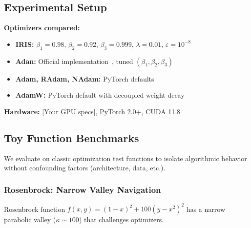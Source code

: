 \subsection{Experimental Setup}

\textbf{Optimizers compared:}
\begin{itemize}
    \item \textbf{IRIS:} $\beta_1=0.98$, $\beta_2=0.92$, $\beta_3=0.999$, $\lambda=0.01$, $\varepsilon=10^{-8}$
    \item \textbf{Adan:} Official implementation~\citep{xie2022adan}, tuned $(\beta_1, \beta_2, \beta_3)$
    \item \textbf{Adam, RAdam, NAdam:} PyTorch defaults
    \item \textbf{AdamW:} PyTorch default with decoupled weight decay
\end{itemize}

\textbf{Hardware:} [Your GPU specs], PyTorch 2.0+, CUDA 11.8

\subsection{Toy Function Benchmarks}

We evaluate on classic optimization test functions to isolate algorithmic behavior without confounding factors (architecture, data, etc.).

\subsubsection{Rosenbrock: Narrow Valley Navigation}

Rosenbrock function $f(x,y) = (1-x)^2 + 100(y-x^2)^2$ has a narrow parabolic valley ($\kappa \sim 100$) that challenges optimizers.


